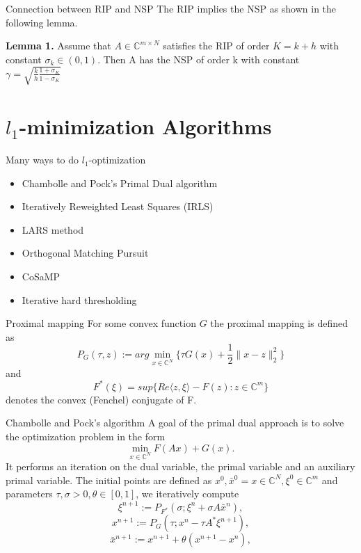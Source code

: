 \documentclass[
  english,            %
  aspectratio=169,    %
]{tumbeamer}
\begin{document}
\begin{frame}{Connection between RIP and NSP}
The RIP implies the NSP as shown in the following lemma.

\bigskip \textbf{Lemma 1.} Assume that $A \in \mathbb{C}^{m \times N}$ satisfies the RIP of order $K = k + h$ with constant $\sigma_k \in (0,1)$. Then A has the NSP of order k with constant $\gamma = \sqrt{\frac{k}{h}\frac{1+\sigma_K}{1-\sigma_K}}$
\end{frame}

\section{$l_1$-minimization Algorithms}

\begin{frame}{Many ways to do $l_1$-optimization}
    \begin{itemize}
        \item Chambolle and Pock's Primal Dual algorithm
        \item Iteratively Reweighted Least Squares (IRLS)
        \item LARS method
        \item Orthogonal Matching Pursuit
        \item CoSaMP
        \item Iterative hard thresholding
    \end{itemize}
\end{frame}

\begin{frame}{Proximal mapping}
For some convex function $G$ the proximal mapping is defined as
\[ P_G(\tau, z) := arg \min_{x \in \mathbb{C}^N} \{\tau G(x) + \frac{1}{2} \lVert x - z \rVert_2^2\} \]
and
\[ F^*(\xi) = sup \{ Re\langle z,\xi \rangle - F(z) : z \in \mathbb{C}^m \} \]
denotes the convex (Fenchel) conjugate of F.
\end{frame}

\begin{frame}{Chambolle and Pock's algorithm}
A goal of the primal dual approach is to solve the optimization problem in the form
\begin{equation}
    \min_{x \in \mathbb{C}^N} F(Ax) + G(x).
\end{equation}
It performs an iteration on the dual variable, the primal variable and an auxiliary primal variable. The initial points are defined as $x^0, \bar{x}^0 = x \in \mathbb{C}^N, \xi^0 \in \mathbb{C}^m$ and parameters $\tau, \sigma > 0, \theta \in [0,1]$, we iteratively compute
\begin{equation}
    \xi^{n+1} := P_{F^*}(\sigma;\xi^n + \sigma A \bar{x}^n),
\end{equation}
\begin{equation}
    x^{n+1} := P_G(\tau; x^n - \tau A^* \xi^{n+1}),
\end{equation}
\begin{equation}
    \bar{x}^{n+1} := x^{n+1} + \theta (x^{n+1} - x^n),
\end{equation}
\end{frame}
\end{document}
